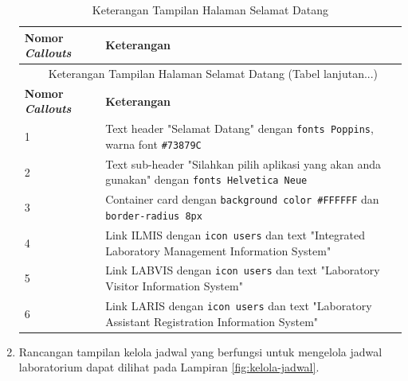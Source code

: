 \begin{enumerate}
	      {

	      \fontsize{10}{13}\selectfont
	      \begin{longtable}{p{4cm} p{9cm}}
		      \caption{Keterangan Tampilan Halaman Selamat Datang}                                                                                     \\
		      \hline
		      \textbf{Nomor \textit{Callouts}} & \textbf{Keterangan}                                                                                   \\
		      \hline
		      \endfirsthead

		      \multicolumn{2}{c}{ \thetable\ {Keterangan Tampilan Halaman Selamat Datang} \space (Tabel lanjutan...)}                                  \\
		      \hline
		      \textbf{Nomor \textit{Callouts}} & \textbf{Keterangan}                                                                                   \\
		      \hline
		      \endhead

		      1                                & Text header "Selamat Datang" dengan \texttt{fonts Poppins}, warna font \texttt{\#73879C}              \\
		      2                                & Text sub-header "Silahkan pilih aplikasi yang akan anda gunakan" dengan \texttt{fonts Helvetica Neue} \\
		      3                                & Container card dengan \texttt{background color \#FFFFFF} dan \texttt{border-radius 8px}               \\
		      4                                & Link ILMIS dengan \texttt{icon users} dan text "Integrated Laboratory Management Information System"  \\
		      5                                & Link LABVIS dengan \texttt{icon users} dan text "Laboratory Visitor Information System"               \\
		      6                                & Link LARIS dengan \texttt{icon users} dan text "Laboratory Assistant Registration Information System" \\
		      \hline
	      \end{longtable}
	      }

	\item Rancangan tampilan kelola jadwal yang berfungsi untuk mengelola jadwal laboratorium dapat dilihat pada Lampiran \ref{fig:kelola-jadwal}. \selectfont



\end{enumerate}
